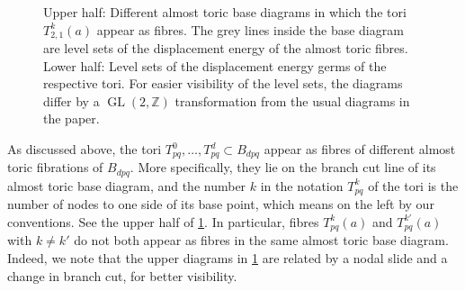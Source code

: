 \documentclass[12pt,a4paper,abstract=true,final]{scrartcl}
\DeclareMathOperator{\GL}{GL}
\begin{document}
\begin{figure}
    \centering
    \caption{Upper half: Different almost toric base diagrams in which the tori $T^k_{2,1}(a)$ appear as fibres. The grey lines inside the base diagram are level sets of the displacement energy of the almost toric fibres. Lower half: Level sets of the displacement energy germs of the respective tori. 
    For easier visibility of the  level sets, the diagrams differ by a $\GL(2,ℤ)$ transformation from the usual diagrams in the paper.}
    \label{fig:germ_examples}
\end{figure}

As discussed above, the tori $T^0_{pq}, \ldots , T^d_{pq} \subset B_{dpq}$ appear as fibres of different almost toric fibrations of $B_{dpq}$.
More specifically, they lie on the branch cut line of its almost toric base diagram, and the number $k$ in the notation $T^k_{pq}$ of the tori is the number of nodes to one side of its base point, which means on the left by our conventions. See the upper half of \cref{fig:germ_examples}.
In particular, fibres $T^k_{pq}(a)$ and $T^{k'}_{pq}(a)$ with $k \neq k'$ do not both appear as fibres in the same almost toric base diagram.
Indeed, we note that the upper diagrams in \cref{fig:germ_examples} are related by a nodal slide and a change in branch cut, for better visibility.
\end{document}
